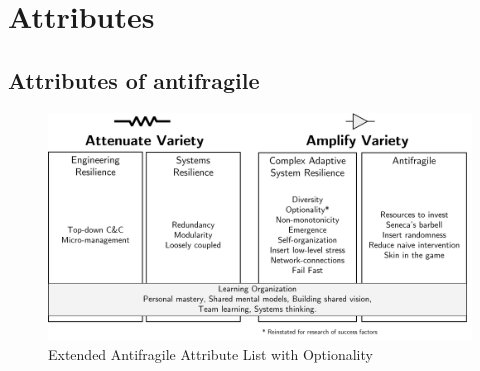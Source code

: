 \chapter{Attributes}
\label{ch:attributes}

\section{Attributes of antifragile}
\label{sec:attributesantifragile}

\begin{figure}[h!]
	\centering
	\includegraphics[width=0.8\linewidth]{images/eaalbwincludingoptionality}
	\caption[Extended Antifragile Attribute List \parencite{Botjes2021} with Optionality]{Extended Antifragile Attribute List \parencite{Botjes2021} with Optionality}
	\label{fig:eaalbwincludingoptionality-attributes}
\end{figure}


